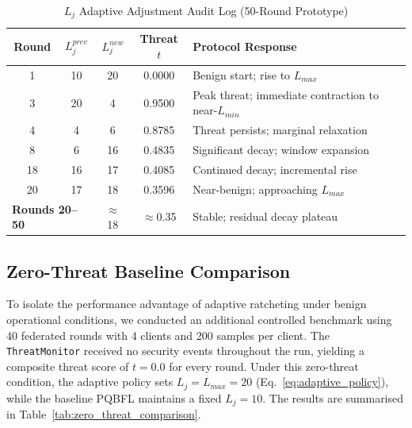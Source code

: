 \documentclass[journal, 10pt, twocolumn]{IEEEtran}
\begin{document}
\begin{table}
\centering
\caption{$L_j$ Adaptive Adjustment Audit Log (50-Round Prototype)}
\label{tab:L_j_audit}
\begin{tabular}{c c c c l}
\toprule
\textbf{Round} & $L_j^{prev}$ & $L_j^{new}$ & \textbf{Threat} $t$ & \textbf{Protocol Response} \\
\midrule
1  & 10 & 20 & 0.0000 & Benign start; rise to $L_{max}$ \\
3  & 20 & 4  & 0.9500 & Peak threat; immediate contraction to near-$L_{min}$ \\
4  & 4  & 6  & 0.8785 & Threat persists; marginal relaxation \\
8  & 6  & 16 & 0.4835 & Significant decay; window expansion \\
18 & 16 & 17 & 0.4085 & Continued decay; incremental rise \\
20 & 17 & 18 & 0.3596 & Near-benign; approaching $L_{max}$ \\
\midrule
\multicolumn{2}{l}{\textbf{Rounds 20--50}} & $\approx$18 & $\approx$0.35 & Stable; residual decay plateau \\
\bottomrule
\end{tabular}
\end{table}

\subsection{Zero-Threat Baseline Comparison}
\label{subsec:zero_threat}
To isolate the performance advantage of adaptive ratcheting under benign operational conditions, we conducted an additional controlled benchmark using 40 federated rounds with 4 clients and 200 samples per client. The \texttt{ThreatMonitor} received no security events throughout the run, yielding a composite threat score of $t = 0.0$ for every round. Under this zero-threat condition, the adaptive policy sets $L_j = L_{max} = 20$ (Eq.~\eqref{eq:adaptive_policy}), while the baseline PQBFL maintains a fixed $L_j = 10$. The results are summarised in Table~\ref{tab:zero_threat_comparison}.
\end{document}
